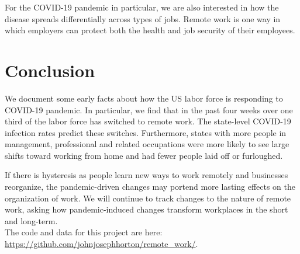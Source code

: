 \documentclass[12pt]{article}
\begin{document}
For the COVID-19 pandemic in particular, we are also interested in how the disease spreads differentially across types of jobs. Remote work is one way in which employers can protect both the health and job security of their employees.





\section{Conclusion}
We document some early facts about how the US labor force is responding to COVID-19 pandemic.  In particular, we find that in the past four weeks over one third of the labor force has switched to remote work. The state-level COVID-19 infection rates predict these switches. Furthermore, states with more people in management, professional and related occupations were more likely to see large shifts toward working from home and had fewer people laid off or furloughed. 

If there is hysteresis as people learn new ways to work remotely and businesses reorganize, the pandemic-driven changes may portend more lasting effects on the organization of work.
We will continue to track changes to the nature of remote work, asking how pandemic-induced changes transform workplaces in the short and long-term. \\

\noindent The code and data for this project are here:
\href{https://github.com/johnjosephhorton/remote\_work/}{https://github.com/johnjosephhorton/remote\_work/}.
\end{document}
